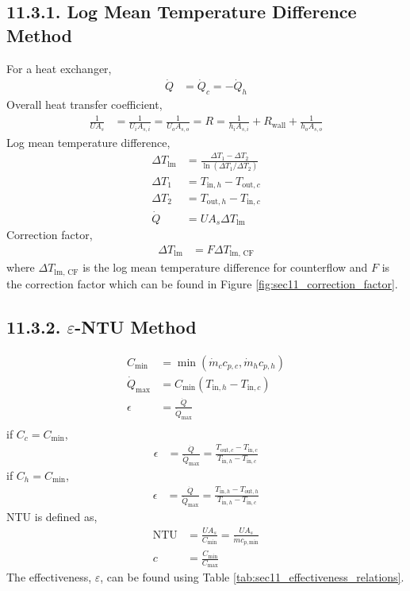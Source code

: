\begin{multicols*}{2}
\subsection*{11.3.1. Log Mean Temperature Difference Method}
For a heat exchanger,
\begin{align*}
    \dot{Q} &= \dot{Q}_{c} = -\dot{Q}_{h} 
\end{align*}
Overall heat transfer coefficient,
\begin{align*}
    \frac{1}{U A_s} &= \frac{1}{U_i A_{s,i}} = \frac{1}{U_o A_{s,o}} = R = \frac{1}{h_i A_{s,i}} +
    R_{\text{wall}} + \frac{1}{h_o A_{s,o}} 
\end{align*}
Log mean temperature difference,
\begin{align*}
    \Delta T_{\text{lm}} &= \frac{\Delta T_1 - \Delta T_2}{\ln(\Delta T_1 / \Delta T_2)} \\
    \Delta T_1 &= T_{\text{in},h} - T_{\text{out},c} \\
    \Delta T_2 &= T_{\text{out},h} - T_{\text{in},c} \\
    \dot{Q} &= U A_s \Delta T_{\text{lm}} 
\end{align*}
Correction factor,
\begin{align*}
    \Delta T_{\text{lm}} &= F \Delta T_{\text{lm, CF}} 
\end{align*}
where $\Delta T_{\text{lm, CF}}$ is the log mean temperature difference for counterflow and $F$ is the correction factor
which can be found in Figure \ref{fig:sec11_correction_factor}.

\subsection*{11.3.2. $\varepsilon$-NTU Method}
\begin{align*} 
    C_{\text{min}} &= \min(\dot{m}_c c_{p,c}, \dot{m}_h c_{p,h}) \\
    \dot{Q}_{\text{max}} &= C_{\text{min}} (T_{\text{in},h} - T_{\text{in},c}) \\
    \epsilon &= \frac{\dot{Q}}{\dot{Q}_{\text{max}}} \\
\end{align*}
if $C_c = C_{\text{min}}$,
\begin{align*}
    \epsilon &= \frac{\dot{Q}}{\dot{Q}_{\text{max}}} = \frac{T_{\text{out}, c} - T_{\text{in}, c}}{T_{\text{in}, h} - T_{\text{in}, c}} 
\end{align*}
if $C_h = C_{\text{min}}$,
\begin{align*}
    \epsilon &= \frac{\dot{Q}}{\dot{Q}_{\text{max}}} = \frac{T_{\text{in}, h} - T_{\text{out}, h}}{T_{\text{in}, h} - T_{\text{in}, c}}
\end{align*}
NTU is defined as,
\begin{align*}
    \text{NTU} &= \frac{UA_{s}}{C_{\text{min}}} = \frac{UA_{s}}{\dot{m} c_{p, \text{min}}} \\
    c &= \frac{C_{\text{min}}}{C_{\text{max}}} 
\end{align*}
The effectiveness, $\varepsilon$, can be found using Table \ref{tab:sec11_effectiveness_relations}.



\end{multicols*}
    
